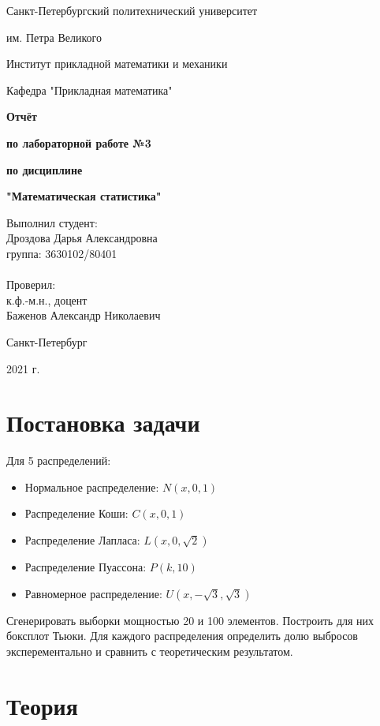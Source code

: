 \documentclass{article}
\begin{document}
\begin{titlepage}
  \centerline {Санкт-Петербургский политехнический университет}
  \centerline { им. Петра Великого}
  \centerline { }
  \centerline {Институт прикладной математики и механики} 
  \centerline {Кафедра "Прикладная математика"}
  \vfill
  \centerline{\textbf{Отчёт}}
  \centerline{\textbf{по лабораторной работе №3}}
  \centerline{\textbf{по дисциплине}}
  \centerline{\textbf{"Математическая статистика"}}
  \vfill
  \hfill
  \begin{minipage}{0.45\textwidth}
  Выполнил студент:\\
  Дроздова Дарья Александровна\\
  группа: 3630102/80401 \\
  \\
  Проверил:\\
  к.ф.-м.н., доцент \\
  Баженов Александр Николаевич
  \end{minipage}
  \vfill
  \centerline {Санкт-Петербург}   
  \centerline {2021 г.}  
\end{titlepage}

\newpage
\setcounter{page}{2}
\tableofcontents

\newpage
\listoftables

\newpage
\listoffigures

\newpage
\section{Постановка задачи}
Для 5 распределений:
  \begin{itemize}
    \item Нормальное распределение: $N(x,0,1)$
    \item Распределение Коши: $C(x,0,1)$
    \item Распределение Лапласа: $L(x,0,\sqrt{2})$
    \item Распределение Пуассона: $P(k,10)$
    \item Равномерное распределение: $U(x,-\sqrt{3}, \sqrt{3})$
  \end{itemize}
Сгенерировать выборки мощностью 20 и 100 элементов. Построить для них боксплот Тьюки. Для каждого распределения определить долю выбросов эксперементально и сравнить с теоретическим результатом.

\newpage
\section{Теория}
\end{document}
